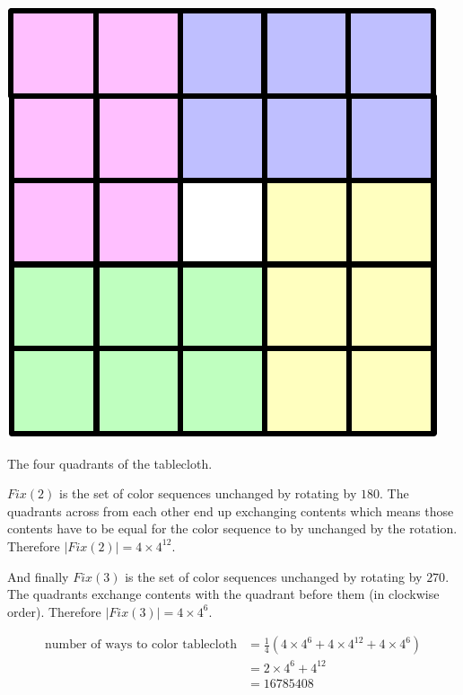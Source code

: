 \begin{marginfigure}[0.5in]
\includegraphics[scale=0.4]{tableclothquadrants}
\caption{The four quadrants of the tablecloth.}
\label{fig:tableclothquadrants}
\end{marginfigure}

$Fix(2)$ is the set of color sequences unchanged by rotating by $180$\textdegree. The quadrants across from each other end up exchanging contents which means those contents have to be equal for the color sequence to by unchanged by the rotation. Therefore $|Fix(2)| = 4 \times 4^{12}$.

And finally $Fix(3)$ is the set of color sequences unchanged by rotating by $270$\textdegree. The quadrants exchange contents with the quadrant before them (in clockwise order). Therefore $|Fix(3)| = 4 \times 4^{6}$.

\begin{align*}
\text{number of ways to color tablecloth} &= \frac{1}{4} (4 \times 4^{6} + 4 \times 4^{12} + 4 \times 4^{6}) \\
                                          &= 2 \times 4^{6} + 4^{12} \\
                                          &= 16785408
\end{align*}


